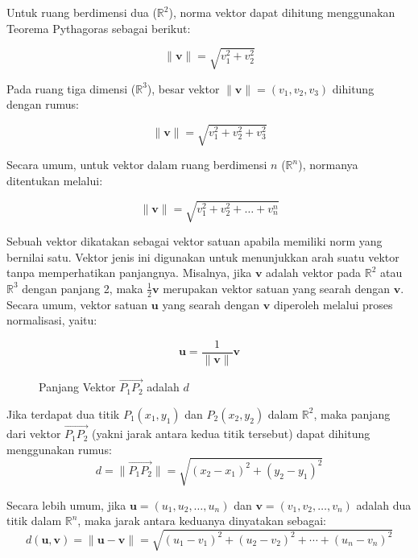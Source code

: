 \documentclass[a4paper,12pt]{report}
\numberwithin{equation}{chapter}
\begin{document}
Untuk ruang berdimensi dua ($\mathbb{R}^2$), norma vektor dapat dihitung menggunakan Teorema Pythagoras sebagai berikut:

\[
    \| \mathbf{v} \| = \sqrt{v_1^2 +v_2^2}
\]

Pada ruang tiga dimensi ($\mathbb{R}^3$), besar vektor $\| \mathbf{v} \| = (v_1,v_2,v_3)$ dihitung dengan rumus:

\[
    \| \mathbf{v} \| = \sqrt{v_1^2 +v_2^2+v_3^2}
\]

Secara umum, untuk vektor dalam ruang berdimensi $n$ ($\mathbb{R}^n$), normanya ditentukan melalui:

\[
    \| \mathbf{v} \| = \sqrt{v_1^2 +v_2^2+\ldots+v_n^n}
\]

Sebuah vektor dikatakan sebagai vektor satuan apabila memiliki norm yang bernilai satu. Vektor jenis ini digunakan untuk menunjukkan arah suatu vektor tanpa memperhatikan panjangnya. Misalnya, jika $\mathbf{v}$ adalah vektor pada $\mathbb{R}^2$ atau $\mathbb{R}^3$ dengan panjang 2, maka $ \frac{1}{2} \mathbf{v}$ merupakan vektor satuan yang searah dengan $\mathbf{v}$. Secara umum, vektor satuan $\mathbf{u}$ yang searah dengan $\mathbf{v}$ diperoleh melalui proses normalisasi, yaitu:

\[
\mathbf{u} = \frac{1}{\| \mathbf{v} \|} \mathbf{v}
\]

\begin{figure}[h!]
    \centering
    \caption{Panjang Vektor $\vec{P_1P_2}$ adalah $d$}
    \label{fig:enter-label}
\end{figure}

Jika terdapat dua titik $P_1(x_1, y_1)$ dan $P_2(x_2, y_2)$ dalam $\mathbb{R}^2$, maka panjang dari vektor $\vec{P_1P_2}$ (yakni jarak antara kedua titik tersebut) dapat dihitung menggunakan rumus:
\[
d = \| \vec{P_1P_2} \| = \sqrt{(x_2 - x_1)^2 + (y_2 - y_1)^2}
\]

Secara lebih umum, jika $\mathbf{u} = (u_1, u_2, \ldots, u_n)$ dan $\mathbf{v} = (v_1, v_2, \ldots, v_n)$ adalah dua titik dalam $\mathbb{R}^n$, maka jarak antara keduanya dinyatakan sebagai:
\[
d(\mathbf{u}, \mathbf{v}) = \| \mathbf{u} - \mathbf{v} \| = \sqrt{(u_1 - v_1)^2 + (u_2 - v_2)^2 + \cdots + (u_n - v_n)^2}
\]
\end{document}
